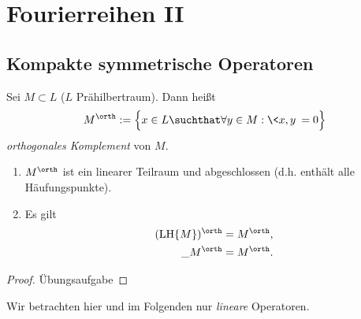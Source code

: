 
\chapter{Fourierreihen II}

\section{Kompakte symmetrische Operatoren}


\begin{df} \label{3.1}
	Sei $M \subset L$ ($L$ Prähilbertraum).
	Dann heißt
	\[
		M^\orth := \Big\{ x \in L \suchthat \forall y \in M : \<x,y\> = 0 \Big\}
	\]
	\emph{orthogonales Komplement} von $M$.
\end{df}

\begin{st} \label{3.2}
	\begin{enumerate}[1)]
		\item
			$M^\orth$ ist ein linearer Teilraum und abgeschlossen (d.h. enthält alle Häufungspunkte).
		\item Es gilt
			\begin{align*}
				(\LH \{M\})^\orth &= M^\orth ,\\
				\_M^\orth &= M^\orth.
			\end{align*}
	\end{enumerate}
	\begin{proof}
		Übungsaufgabe 
	\end{proof}
\end{st}

\begin{conv*}
	Wir betrachten hier und im Folgenden nur \emph{lineare} Operatoren.
\end{conv*}

